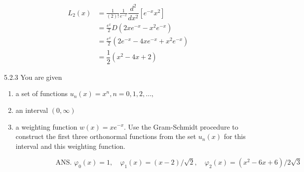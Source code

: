 $$\begin{aligned} 
L_{2}(x) &=\frac{1}{(2) !} \frac{1}{e^{-x}} \dfrac{d^2}{dx^2}\left[e^{-x} x^{2}\right] \\ 
&=\frac{e^{x}}{2} D\left(2 x e^{-x}-x^{2} e^{-x}\right) \\ 
&=\frac{e^{x}}{2}\left(2 e^{-x}-4 x e^{-x}+x^{2} e^{-x}\right) \\
&=\dfrac{1}{2}(x^2 - 4x+2)
\end{aligned}$$

\newpage

\begin{mybox}{5.2.3}
You are given
\begin{enumerate}[$(a)$]
\item a set of functions $u_{n}(x)=x^{n}, n=0,1,2, \ldots,$
\item an interval $(0, \infty)$
\item a weighting function $w(x)=x e^{-x}$. Use the Gram-Schmidt procedure to construct the first three orthonormal functions from the set $u_{n}(x)$ for this interval and this weighting function.
\end{enumerate}
$$
\hspace{3cm}\text { ANS. } \varphi_{0}(x)=1, \quad \varphi_{1}(x)=(x-2) / \sqrt{2}, \quad \varphi_{2}(x)=\left(x^{2}-6 x+6\right) / 2 \sqrt{3}
$$
\end{mybox}

